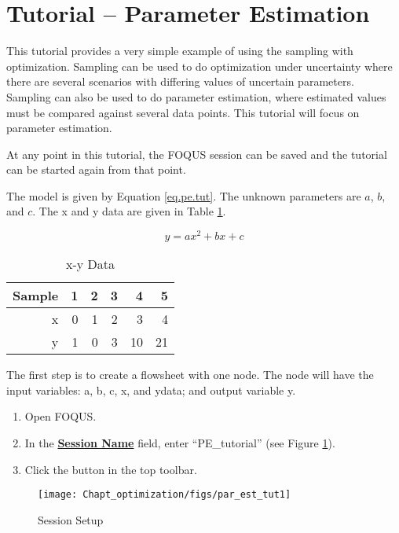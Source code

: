 \section{Tutorial -- Parameter Estimation}

This tutorial provides a very simple example of using the sampling with optimization. Sampling can be used to do optimization under uncertainty where there are several scenarios with differing values of uncertain parameters. Sampling can also be used to do parameter estimation, where estimated values must be compared against several data points. This tutorial will focus on parameter estimation.

At any point in this tutorial, the FOQUS session can be saved and the tutorial can be started again from that point.

The model is given by Equation \ref{eq.pe.tut}.  The unknown parameters are $a$, $b$, and $c$. The x and y data are given in Table \ref{table.pe.data}.

\begin{equation}\label{eq.pe.tut}
y = ax^2 + bx + c
\end{equation}

\begin{table}[H]
	\begin{center}
		\caption{x-y Data}\label{table.pe.data}
		\begin{tabularx}{2.1in}{r r r r r r}
			\hline
			Sample  & 1 & 2 & 3 & 4 & 5 \\
			\hline
			x & 0 & 1 & 2 & 3  & 4 	 \\
			y & 1 & 0 & 3 & 10 & 21  \\
			\hline
		\end{tabularx}
	\end{center}
\end{table}

The first step is to create a flowsheet with one node.  The node will have the input variables: a, b, c, x, and ydata; and output variable y.
\begin{enumerate}
	\item Open FOQUS.
	\item In the \textbf{\underline{Session Name}} field, enter ``PE\_tutorial'' (see Figure \ref{fig.pe.tut1}).
	\item Click the  button in the top toolbar.
\end{enumerate}

\begin{figure}[H]
	\begin{center}
		\texttt{[image: Chapt\_optimization/figs/par\_est\_tut1]}
		\caption{Session Setup}
		\label{fig.pe.tut1}
	\end{center}
\end{figure}

